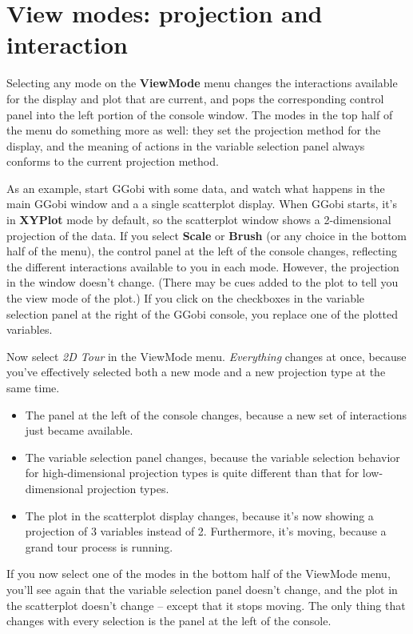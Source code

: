 \documentclass[11pt]{article}
\begin{document}
\section{View modes: projection and interaction}
\label{slbl:ViewModes}

Selecting any mode on the {\bf ViewMode} menu changes the interactions
available for the display and plot that are current, and pops the
corresponding control panel into the left portion of the console
window.  The modes in the top half of the menu do something more as
well:  they set the projection method for the display, and the meaning
of actions in the variable selection panel always conforms to the current
projection method.

As an example, start GGobi with some data, and watch what happens in
the main GGobi window and a a single scatterplot display.   When
GGobi starts, it's in {\bf XYPlot} mode by default, so the
scatterplot window shows a 2-dimensional projection of the data.  If
you select {\bf Scale} or {\bf Brush} (or any choice in the bottom
half of the menu), the control panel at the left of the console
changes, reflecting the different interactions available to you in
each mode.  However, the projection in the window doesn't change.
(There may be cues added to the plot to tell you the view mode of the
plot.) If you click on the checkboxes in the variable selection panel
at the right of the GGobi console, you replace one of the plotted
variables.

Now select {\em 2D Tour} in the ViewMode menu.  {\em Everything}
changes at once, because you've effectively selected both a new mode and
a new projection type at the same time.
\begin{itemize}
\itemsep 0em
\item The panel at the left of the console changes, because a
      new set of interactions just became available.
\item The variable selection panel changes, because the variable
      selection behavior for high-dimensional projection types is
      quite different than that for low-dimensional projection types.
\item The plot in the scatterplot display changes, because it's
      now showing a projection of 3 variables instead of 2.  Furthermore,
      it's moving, because a grand tour process is running.
\end{itemize}

If you now select one of the modes in the bottom half of the ViewMode
menu, you'll see again that the variable selection panel doesn't
change, and the plot in the scatterplot doesn't change -- except
that it stops moving.  The only thing that changes with every
selection is the panel at the left of the console.
\end{document}
